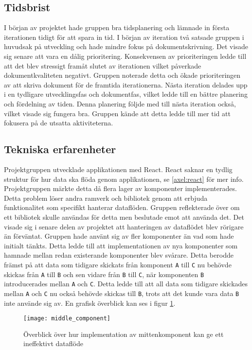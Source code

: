 \subsection{Tidsbrist}
I början av projektet hade gruppen bra tidsplanering och lämnade in första iterationen tidigt för att spara in tid. I början av iteration två satsade gruppen i huvudsak på utveckling och hade mindre fokus på dokumentskrivning. Det visade sig senare att vara en dålig prioritering. Konsekvensen av prioriteringen ledde till att det blev stressigt framåt slutet av iterationen vilket påverkade dokumentkvaliteten negativt. Gruppen noterade detta och ökade prioriteringen av att skriva dokument för de framtida iterationerna. Nästa iteration delades upp i en tydligare utvecklingsfas och dokumentfas, vilket ledde till en bättre planering och fördelning av tiden. Denna planering följde med till nästa iteration också, vilket visade sig fungera bra. Gruppen kände att detta ledde till mer tid att fokusera på de utsatta aktiviteterna.

\subsection{Tekniska erfarenheter}
Projektgruppen utvecklade applikationen med React. React saknar en tydlig struktur för hur data ska flöda genom applikationen, se \ref{axel:react} för mer info. Projektgruppen märkte detta då flera lager av komponenter implementerades. Detta problem löser andra ramverk och bibliotek genom att erbjuda funktionalitet som specifikt hanterar dataflöden. Gruppen reflekterade över om ett bibliotek skulle användas för detta men beslutade emot att använda det. Det visade sig i senare delen av projektet att hanteringen av dataflödet blev rörigare än förväntat. Gruppen hade använt sig av fler komponenter än vad som hade initialt tänkts. Detta ledde till att implementationen av nya komponenter som hamnade mellan redan existerande komponenter blev svårare. Detta berodde främst på att data som tidigare skickats från komponent \texttt{A} till \texttt{C} nu behövde skickas från \texttt{A} till \texttt{B} och sen vidare från \texttt{B} till \texttt{C}, när komponenten \texttt{B} introducerades mellan \texttt{A} och \texttt{C}. Detta ledde till att all data som tidigare skickades mellan \texttt{A} och \texttt{C} nu också behövde skickas till \texttt{B}, trots att det kunde vara data \texttt{B} inte använde sig av. En grafisk överblick kan ses i figur \ref{fig:middle_component}.

\begin{figure}[H]
    \centering
    \texttt{[image: middle\_component]}
    \caption{Överblick över hur implementation av mittenkomponent kan ge ett ineffektivt dataflöde}
    \label{fig:middle_component}
\end{figure}

